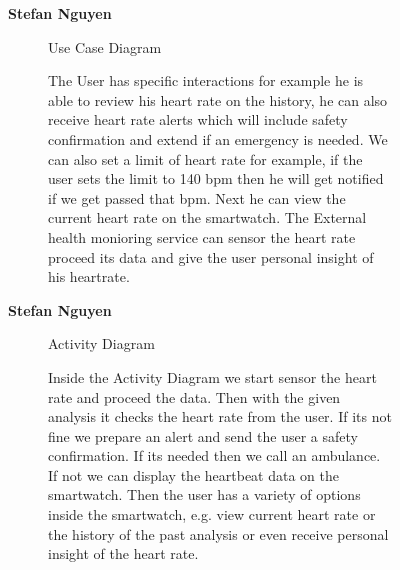 \documentclass{article}
\begin{document}
	\begin{figure}[htbp]
		\textbf{Stefan Nguyen}
		\centering
		\begin{subfigure}{\textwidth}
			\resizebox{\textwidth}{!}{}
			\caption{Use Case Diagram}
		\end{subfigure}
		\begin{subfigure}{\textwidth}
			The User has specific interactions for example he is able to review his heart rate on the history, he can also receive
			heart rate alerts which will include safety confirmation and extend if an emergency is needed. We can also set a limit of heart rate for example,
			if the user sets the limit to 140 bpm then he will get notified if we get passed that bpm. Next he can view the current heart rate on the smartwatch.
			The External health monioring service can sensor the heart rate proceed its data and give the user personal insight of his heartrate. 
		\end{subfigure}
	\end{figure}
	\clearpage

	\begin{figure}[htbp]
		\textbf{Stefan Nguyen}
		\centering
		\begin{subfigure}{\textwidth}
			\resizebox{\textwidth}{!}{}
			\caption{Activity Diagram}
		\end{subfigure}
		\begin{subfigure}{\textwidth}
			Inside the Activity Diagram we start sensor the heart rate and proceed the data. Then with the given analysis it checks the 
			heart rate from the user. If its not fine we prepare an alert and send the user a safety confirmation. If its needed then we call an ambulance. If not 
			we can display the heartbeat data on the smartwatch. Then the user has a variety of options inside the smartwatch, e.g. 
			view current heart rate or the history of the past analysis or even receive personal insight of the heart rate. 
		\end{subfigure}
	\end{figure}
\end{document}
